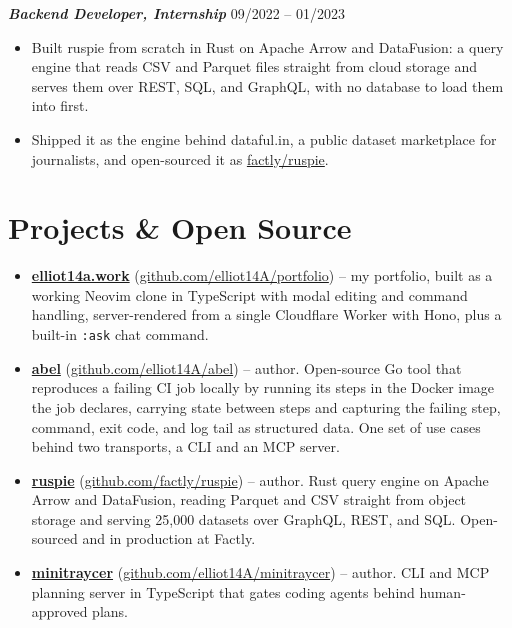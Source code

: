 \documentclass[10pt,a4paper]{article}
\newcommand{\subentryheader}[2]{
  \noindent\textbf{\color{primary}\textit{\small #1}} \hfill {\small\color{meta}#2}\vspace{1.5pt}
}
\begin{document}
\subentryheader{Backend Developer, Internship}{09/2022 -- 01/2023}
\begin{itemize}
  \item Built ruspie from scratch in Rust on Apache Arrow and DataFusion: a query engine that reads CSV and Parquet files straight from cloud storage and serves them over REST, SQL, and GraphQL, with no database to load them into first.
  \item Shipped it as the engine behind dataful.in, a public dataset marketplace for journalists, and open-sourced it as \href{https://github.com/factly/ruspie}{factly/ruspie}.
\end{itemize}

\section*{Projects \& Open Source}
\begin{itemize}
  \item \textbf{\href{https://elliot14a.work}{elliot14a.work}} (\href{https://github.com/elliot14A/portfolio}{github.com/elliot14A/portfolio}) -- my portfolio, built as a working Neovim clone in TypeScript with modal editing and command handling, server-rendered from a single Cloudflare Worker with Hono, plus a built-in \texttt{:ask} chat command.
  \item \textbf{\href{https://github.com/elliot14A/abel}{abel}} (\href{https://github.com/elliot14A/abel}{github.com/elliot14A/abel}) -- author. Open-source Go tool that reproduces a failing CI job locally by running its steps in the Docker image the job declares, carrying state between steps and capturing the failing step, command, exit code, and log tail as structured data. One set of use cases behind two transports, a CLI and an MCP server.
  \item \textbf{\href{https://github.com/factly/ruspie}{ruspie}} (\href{https://github.com/factly/ruspie}{github.com/factly/ruspie}) -- author. Rust query engine on Apache Arrow and DataFusion, reading Parquet and CSV straight from object storage and serving 25,000 datasets over GraphQL, REST, and SQL. Open-sourced and in production at Factly.
  \item \textbf{\href{https://github.com/elliot14A/minitraycer}{minitraycer}} (\href{https://github.com/elliot14A/minitraycer}{github.com/elliot14A/minitraycer}) -- author. CLI and MCP planning server in TypeScript that gates coding agents behind human-approved plans.
\end{itemize}
\end{document}
